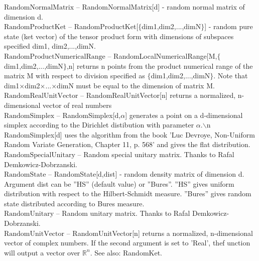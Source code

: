 \documentclass[a4paper,10pt]{scrartcl}
\begin{document}
\textbf{$ \text{RandomNormalMatrix} $ }-- RandomNormalMatrix[d] - random normal matrix of dimension d.$  $\\

\textbf{$ \text{RandomProductKet} $ }-- RandomProductKet[$\{$dim1,dim2,...,dimN$\}$] - random pure state (ket vector) of the tensor product form with dimensions of subspaces specified dim1, dim2,...,dimN.$  $\\

\textbf{$ \text{RandomProductNumericalRange} $ }-- RandomLocalNumericalRange[M,$\{$dim1,dim2,...,dimN$\}$,n] returns n points from the product numerical range of the matrix M with respect to division specified as $\{$dim1,dim2,...,dimN$\}$. Note that dim1$\times $dim2$\times $...$\times $dimN must be equal to the dimension of matrix M.$  $\\

\textbf{$ \text{RandomRealUnitVector} $ }-- RandomRealUnitVector[n] returns a normalized, n-dimensional vector of real numbers$  $\\

\textbf{$ \text{RandomSimplex} $ }-- RandomSimplex[d,$\alpha $] generates a point on a d-dimensional simplex according to the Dirichlet distibution with parameter $\alpha $.$\backslash $n RandomSimplex[d] uses the algorithm from the book 'Luc Devroye, Non-Uniform Random Variate Generation, Chapter 11, p. 568' and gives the flat distribution.$  $\\

\textbf{$ \text{RandomSpecialUnitary} $ }-- Random special unitary matrix. Thanks to Rafal Demkowicz-Dobrzanski.$  $\\

\textbf{$ \text{RandomState} $ }-- RandomState[d,dist] - random density matrix of dimension d. Argument dist can be ''HS'' (default value) or ''Bures''. ''HS'' gives uniform distribution with respect to the Hilbert-Schmidt measure. ''Bures'' gives random state distributed according to Bures measure.$  $\\

\textbf{$ \text{RandomUnitary} $ }-- Random unitary matrix. Thanks to Rafal Demkowicz-Dobrzanski.$  $\\

\textbf{$ \text{RandomUnitVector} $ }-- RandomUnitVector[n] returns a normalized, n-dimensional vector of complex numbers. If the second argument is set to 'Real', thef unction will output a vector over $ \mathbb{R}^n $. See also: RandomKet.$  $\\
\end{document}
